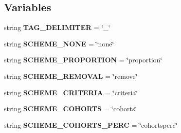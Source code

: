 \subsection*{Variables}
\begin{DoxyCompactItemize}
\item 
string {\bfseries T\+A\+G\+\_\+\+D\+E\+L\+I\+M\+I\+T\+ER} = \char`\"{}\+\_\+\char`\"{}\hypertarget{namespacenegui_1_1genepopfilesampler_a218e2f958da027b600c72bb577a3ff39}{}\label{namespacenegui_1_1genepopfilesampler_a218e2f958da027b600c72bb577a3ff39}

\item 
string {\bfseries S\+C\+H\+E\+M\+E\+\_\+\+N\+O\+NE} = \char`\"{}none\char`\"{}\hypertarget{namespacenegui_1_1genepopfilesampler_a28ebe15ea3a6144faad3f28e8ae22934}{}\label{namespacenegui_1_1genepopfilesampler_a28ebe15ea3a6144faad3f28e8ae22934}

\item 
string {\bfseries S\+C\+H\+E\+M\+E\+\_\+\+P\+R\+O\+P\+O\+R\+T\+I\+ON} = \char`\"{}proportion\char`\"{}\hypertarget{namespacenegui_1_1genepopfilesampler_a08d38d14135ba2b092e3090b0e1e74b1}{}\label{namespacenegui_1_1genepopfilesampler_a08d38d14135ba2b092e3090b0e1e74b1}

\item 
string {\bfseries S\+C\+H\+E\+M\+E\+\_\+\+R\+E\+M\+O\+V\+AL} = \char`\"{}remove\char`\"{}\hypertarget{namespacenegui_1_1genepopfilesampler_a0257c159f203d90380dfed2404ccc3a1}{}\label{namespacenegui_1_1genepopfilesampler_a0257c159f203d90380dfed2404ccc3a1}

\item 
string {\bfseries S\+C\+H\+E\+M\+E\+\_\+\+C\+R\+I\+T\+E\+R\+IA} = \char`\"{}criteria\char`\"{}\hypertarget{namespacenegui_1_1genepopfilesampler_a588f1b68f192dd6901bac76e51979419}{}\label{namespacenegui_1_1genepopfilesampler_a588f1b68f192dd6901bac76e51979419}

\item 
string {\bfseries S\+C\+H\+E\+M\+E\+\_\+\+C\+O\+H\+O\+R\+TS} = \char`\"{}cohorts\char`\"{}\hypertarget{namespacenegui_1_1genepopfilesampler_ac13c205986ea013af9a7b7a908529e93}{}\label{namespacenegui_1_1genepopfilesampler_ac13c205986ea013af9a7b7a908529e93}

\item 
string {\bfseries S\+C\+H\+E\+M\+E\+\_\+\+C\+O\+H\+O\+R\+T\+S\+\_\+\+P\+E\+RC} = \char`\"{}cohortsperc\char`\"{}\hypertarget{namespacenegui_1_1genepopfilesampler_a7f5a5b4d8448a86c851646fbb8d923c6}{}\label{namespacenegui_1_1genepopfilesampler_a7f5a5b4d8448a86c851646fbb8d923c6}


\end{DoxyCompactItemize}
